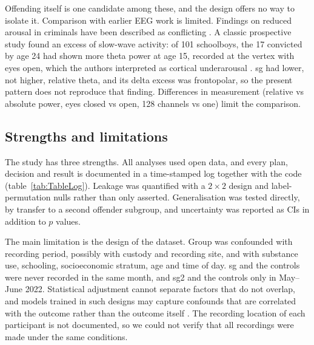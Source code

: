 Offending itself is one candidate among these, and the design offers no way to isolate it. Comparison with earlier EEG work is limited. Findings on reduced arousal in criminals have been described as conflicting \cite{Raine1990}. A classic prospective study found an excess of slow-wave activity: of 101 schoolboys, the 17 convicted by age 24 had shown more theta power at age 15, recorded at the vertex with eyes open, which the authors interpreted as cortical underarousal \cite{Raine1990}. sg had lower, not higher, relative theta, and its delta excess was frontopolar, so the present pattern does not reproduce that finding. Differences in measurement (relative vs absolute power, eyes closed vs open, 128 channels vs one) limit the comparison.

\subsection{Strengths and limitations}
\label{sec:disc-limitations}

The study has three strengths. All analyses used open data, and every plan, decision and result is documented in a time-stamped log together with the code (table~\ref{tab:TableLog}). Leakage was quantified with a $2 \times 2$ design and label-permutation nulls rather than only asserted. Generalisation was tested directly, by transfer to a second offender subgroup, and uncertainty was reported as CIs in addition to $p$ values.

The main limitation is the design of the dataset. Group was confounded with recording period, possibly with custody and recording site, and with substance use, schooling, socioeconomic stratum, age and time of day. sg and the controls were never recorded in the same month, and sg2 and the controls only in May--June 2022. Statistical adjustment cannot separate factors that do not overlap, and models trained in such designs may capture confounds that are correlated with the outcome rather than the outcome itself \cite{Chyzhyk2022}. The recording location of each participant is not documented, so we could not verify that all recordings were made under the same conditions.

